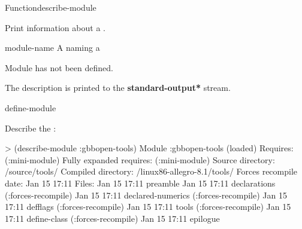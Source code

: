 \documentclass[10pt,twoside,english,pdftex]{article}
\begin{document}
\begin{functiondoc}{Function}{describe-module}{}
%
%
%

\fnsyntax 

\fnpurpose Print information about a .

\fnpackage {}

\fnmodule {}

\fnargs
\begin{args}{module-name}
 A  naming a 
\end{args}

\fnerrors
Module  has not been defined.\\
\relativedircircularity

\fndescription
{}%
The description is printed to the {\bf *standard-output*} stream.

\begin{alsos}{define-module}
\end{alsos}

\fnexample
Describe the  :
%
\W\supp
\begin{example}
> (describe-module :gbbopen-tools)
Module :gbbopen-tools (loaded)
  Requires: (:mini-module)
  Fully expanded requires: (:mini-module)
  Source directory: /source/tools/
  Compiled directory: /linux86-allegro-8.1/tools/
  Forces recompile date: Jan 15 17:11
  Files: Jan 15 17:11 preamble 
         Jan 15 17:11 declarations (:forces-recompile)
         Jan 15 17:11 declared-numerics (:forces-recompile)
         Jan 15 17:11 defflags (:forces-recompile)
         Jan 15 17:11 tools (:forces-recompile)
         Jan 15 17:11 define-class (:forces-recompile)
         Jan 15 17:11 epilogue 
\end{example} 

\end{functiondoc}

\end{document}
